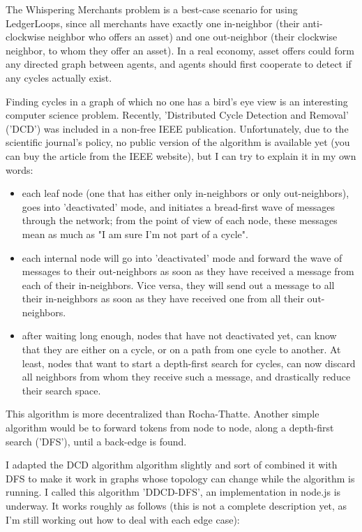\documentclass[11pt,twoside,a4paper]{article}
\begin{document}
The Whispering Merchants problem is a best-case scenario for using LedgerLoops, since all merchants have exactly one in-neighbor (their anti-clockwise neighbor who offers an asset) and one out-neighbor (their clockwise neighbor, to whom they offer an asset). In a real economy, asset offers could form any directed graph between agents, and agents should first cooperate to detect if any cycles actually exist.

Finding cycles in a graph of which no one has a bird's eye view is an interesting computer science problem. Recently, 'Distributed Cycle Detection and Removal' ~\cite{Oliva2016} ('DCD') was included in a non-free IEEE publication. Unfortunately, due to the scientific journal's policy, no public version of the algorithm is available yet (you can buy the article from the IEEE website), but I can try to explain it in my own words:

\begin{itemize}
\item each leaf node (one that has either only in-neighbors or only out-neighbors), goes into 'deactivated' mode, and initiates a bread-first wave of messages through the network; from the point of view of each node, these messages mean as much as "I am sure I'm not part of a cycle".
\item each internal node will go into 'deactivated' mode and forward the wave of messages to their out-neighbors as soon as they have received a message from each of their in-neighbors. Vice versa, they will send out a message to all their in-neighbors as soon as they have received one from all their out-neighbors.
\item after waiting long enough, nodes that have not deactivated yet, can know that they are either on a cycle, or on a path from one cycle to another. At least, nodes that want to start a depth-first search for cycles, can now discard all neighbors from whom they receive such a message, and drastically reduce their search space.
\end{itemize}

This algorithm is more decentralized than Rocha-Thatte. Another simple algorithm would be to forward tokens from node to node, along a depth-first search ('DFS'), until a back-edge is found.

I adapted the DCD algorithm algorithm slightly and sort of combined it with DFS to make it work in graphs whose topology can change while the algorithm is running. I called this algorithm 'DDCD-DFS', an implementation in node.js is underway. It works roughly as follows (this is not a complete description yet, as I'm still working out how to deal with each edge case):
\end{document}
